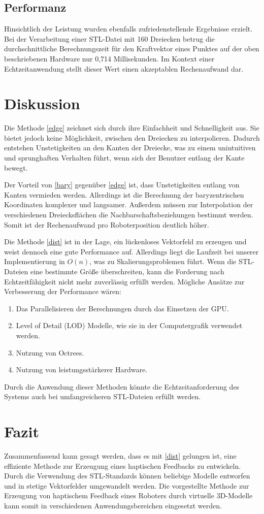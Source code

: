 \documentclass[conference]{IEEEtran}
\begin{document}
\subsection{Performanz}
Hinsichtlich der Leistung wurden ebenfalls zufriedenstellende Ergebnisse erzielt. Bei der Verarbeitung einer STL-Datei mit 160 Dreiecken betrug die durchschnittliche Berechnungszeit für den Kraftvektor eines Punktes auf der oben beschriebenen Hardware nur 0,714 Millisekunden. Im Kontext einer Echtzeitanwendung stellt dieser Wert einen akzeptablen Rechenaufwand dar.

\section{Diskussion}
Die Methode \ref*{edge} zeichnet sich durch ihre Einfachheit und Schnelligkeit aus. Sie bietet jedoch keine Möglichkeit, zwischen den Dreiecken zu interpolieren. Dadurch entstehen Unstetigkeiten an den Kanten der Dreiecke, was zu einem unintuitiven und sprunghaften Verhalten führt, wenn sich der Benutzer entlang der Kante bewegt.

Der Vorteil von \ref*{bary} gegenüber \ref*{edge} ist, dass Unstetigkeiten entlang von Kanten vermieden werden. Allerdings ist die Berechnung der baryzentrischen Koordinaten komplexer und langsamer. Außerdem müssen zur Interpolation der verschiedenen Dreiecksflächen die Nachbarschaftsbeziehungen bestimmt werden. Somit ist der Rechenaufwand pro Roboterposition deutlich höher.

Die Methode \ref*{dist} ist in der Lage, ein lückenloses Vektorfeld zu erzeugen und weist dennoch eine gute Performance auf. Allerdings liegt die Laufzeit bei unserer Implementierung in $O(n)$, was zu Skalierungsproblemen führt. Wenn die STL-Dateien eine bestimmte Größe überschreiten, kann die Forderung nach Echtzeitfähigkeit nicht mehr zuverlässig erfüllt werden. Mögliche Ansätze zur Verbesserung der Performance wären:
\begin{enumerate}
    \item Das Parallelisieren der Berechnungen durch das Einsetzen der GPU.
    \item Level of Detail (LOD) Modelle, wie sie in der Computergrafik verwendet werden.
    \item Nutzung von Octrees.
    \item Nutzung von leistungsstärkerer Hardware.
\end{enumerate}
Durch die Anwendung dieser Methoden könnte die Echtzeitanforderung des Systems auch bei umfangreicheren STL-Dateien erfüllt werden.

\section{Fazit}
Zusammenfassend kann gesagt werden, dass es mit \ref*{dist} gelungen ist, eine effiziente Methode zur Erzeugung eines haptischen Feedbacks zu entwickeln. Durch die Verwendung des STL-Standards können beliebige Modelle entworfen und in stetige Vektorfelder umgewandelt werden. Die vorgestellte Methode zur Erzeugung von haptischem Feedback eines Roboters durch virtuelle 3D-Modelle kann somit in verschiedenen Anwendungsbereichen eingesetzt werden.

\printbibliography
\end{document}
